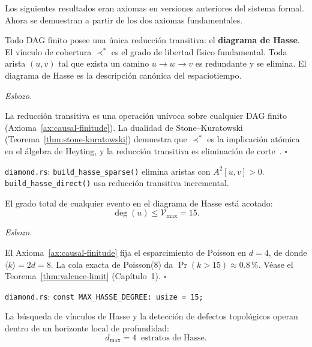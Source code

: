 \documentclass[11pt, a4paper, openany]{book}
\newcommand{\covers}{\prec^{\!*}}
\renewenvironment{proof}[1][Demostraci\'on]{%
  \par\noindent\textit{#1.}\quad
}{\hfill$\square$\par\medskip}
\begin{document}
\noindent
Los siguientes resultados eran axiomas en versiones anteriores del
sistema formal. Ahora se demuestran a partir de los dos axiomas
fundamentales.

\begin{theorem}
\label{thm:covering-differential}
Todo DAG finito posee una \'unica reducci\'on transitiva: el
\textbf{diagrama de Hasse}. El v\'inculo de cobertura $\covers$ es
el grado de libertad f\'isico fundamental. Toda arista $(u,v)$ tal
que exista un camino $u \to w \to v$ es redundante y se elimina.
El diagrama de Hasse es la descripci\'on can\'onica del
espaciotiempo.
\end{theorem}

\begin{proof}[Esbozo]
La reducci\'on transitiva es una operaci\'on un\'ivoca sobre cualquier
DAG finito (Axioma~\ref{ax:causal-finitude}). La dualidad de
Stone--Kuratowski (Teorema~\ref{thm:stone-kuratowski}) demuestra que
$\covers$ es la implicaci\'on at\'omica en el \'algebra de
Heyting, y la reducci\'on transitiva es eliminaci\'on de
corte~\cite{gentzen1935}.
\end{proof}

\medskip\noindent
\texttt{diamond.rs}: \texttt{build\_hasse\_sparse()} elimina
aristas con $A^2[u,v] > 0$. \texttt{build\_hasse\_direct()} usa
reducci\'on transitiva incremental.

\begin{theorem}
\label{thm:valence-saturation}
El grado total de cualquier evento en el diagrama de Hasse est\'a
acotado:
\begin{equation}
  \deg(u) \leq \mathcal{V}_{\max} = 15.
  \label{eq:ax-valence}
\end{equation}
\end{theorem}

\begin{proof}[Esbozo]
El Axioma~\ref{ax:causal-finitude} fija el esparcimiento de
Poisson en $d = 4$, de donde $\langle k\rangle = 2d = 8$. La
cola exacta de Poisson($8$) da $\Pr(k > 15) \approx 0{.}8\,\%$.
V\'ease el Teorema~\ref{thm:valence-limit} (Cap\'itulo~1).
\end{proof}

\medskip\noindent
\texttt{diamond.rs}: \texttt{const MAX\_HASSE\_DEGREE: usize = 15;}

\begin{theorem}
\label{thm:causal-locality}
La b\'usqueda de v\'inculos de Hasse y la detecci\'on de
defectos topol\'ogicos operan dentro de un horizonte local de
profundidad:
\begin{equation}
  d_{\max} = 4 \;\;\text{estratos de Hasse.}
  \label{eq:ax-locality}
\end{equation}
\end{theorem}
\end{document}
